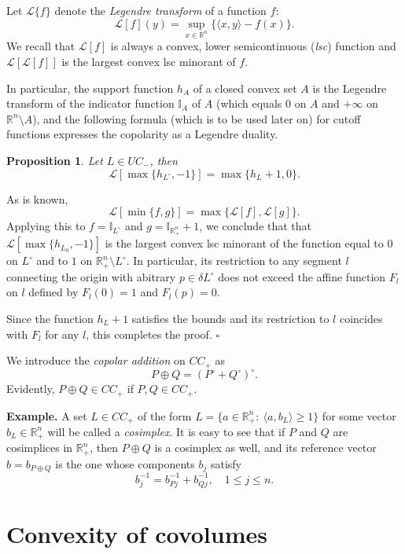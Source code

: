 \documentclass[12pt]{article}
\newcommand{\beq}{\begin{equation}}
\newcommand{\eeq}{\end{equation}}
\numberwithin{equation}{section}
\newtheorem{proposition}{Proposition}[section]
\newenvironment{proof}{\medbreak\noindent{\it Proof.}\rm}{\hfill$\square$\rm}
\newcommand{\Rn}{{\mathbb R}^n}
\newcommand{\Rnp}{{\mathbb R}_+^n}
\newcommand{\ii}{{\mathbb  I}}
\newcommand{\cL}{{\mathcal  L}}
\begin{document}
\medskip

Let $\cL\{f\}$ denote the {\it Legendre transform} of a function $f$:
$$ \cL[f](y)=\sup_{x\in\Rn}\{\langle x,y\rangle -f(x)\}.$$
We recall that $\cL[f]$ is always a convex, lower semicontinuous ({\it lsc}) function and $\cL[\cL[f]]$ is the largest convex lsc minorant of $f$.

In particular, the support function $h_A$ of a closed convex set $A$ is the Legendre transform of the indicator function $\ii_A$ of $A$ (which equals $0$ on $A$ and $+\infty$ on $\Rn\setminus A$), and the following formula (which is to be used later on) for cutoff functions expresses the copolarity as a Legendre duality.

\begin{proposition}\label{Leg} Let $L\in UC_-$, then
$$ \cL[\max \{h_{L^\circ},-1\}]=\max\{h_L+1,0\}.$$
\end{proposition}

\begin{proof} As is known,
$$\cL[\min\{f,g\}]=\max\{\cL[f],\cL[g]\}. $$
Applying this to $f=\ii_{L^\circ}$ and $g=\ii_{\Rnp}+1$, we conclude that that $\cL[\max \{h_{L_0},-1\}]$ is the largest convex lsc minorant of the function equal to $0$ on $L^\circ$ and to $1$ on $\Rnp\setminus L^\circ$. In particular, its restriction to any segment $l$ connecting the origin with abitrary $p\in\delta L^\circ$ does not exceed the affine function $F_l$ on $l$ defined by $F_l(0)=1$ and $F_l(p)=0$.

Since  the function $h_L+1$ satisfies the bounds and its restriction to $l$ coincides with $F_l$ for any $l$, this completes the proof.
\end{proof}

\medskip


We introduce the {\it copolar addition} on $CC_+$ as
\beq\label{newsum} P\oplus Q=\left(P^\circ + Q^\circ\right)^\circ.\eeq
Evidently, $P\oplus Q\in CC_+$ if $P,Q\in CC_+$.

\medskip

{\bf Example.} A set $L\in CC_+$ of the form $L=\{a\in\Rnp:\: \langle a,b_L\rangle\ge 1\}$ for some vector $b_L\in\Rnp$ will be called a {\it cosimplex}. It is easy to see that if $P$ and $Q$ are cosimplices in $\Rnp$, then $P\oplus Q$ is a cosimplex as well, and its reference vector $b=b_{P\oplus Q}$  is the one whose components $b_j$ satisfy
$$b_j^{-1}=b_{Pj}^{-1} + b_{Qj}^{-1},\quad 1\le j\le n.$$


\section{Convexity of covolumes}
\end{document}

